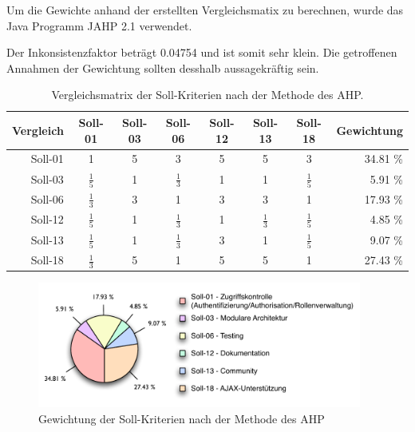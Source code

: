   Um die Gewichte anhand der erstellten Vergleichsmatix zu berechnen, wurde das
  Java Programm JAHP 2.1 verwendet.
  
  Der Inkonsistenzfaktor beträgt 0.04754 und ist somit sehr klein. Die
  getroffenen Annahmen der Gewichtung sollten desshalb aussagekräftig sein.
  \newline
  
  \begin{table}[!h]
    \sffamily 
    \begin{center}
      \begin{tabular}{r|cccccc|r}
        \toprule
        \textbf{Vergleich} & Soll-01 & Soll-03 & Soll-06 & Soll-12 & Soll-13 &
        Soll-18 & \textbf{Gewichtung}\\
        \midrule
        Soll-01 & 1 & 5 & 3 & 5 & 5 & 3 & 34.81 \%\\
        Soll-03 & $\frac{1}{5}$ & 1 & $\frac{1}{3}$ & 1 & 1 & $\frac{1}{5}$ &
        5.91 \%\\
        Soll-06 & $\frac{1}{3}$ & 3 & 1 & 3 & 3 & 1 & 17.93 \%\\
        Soll-12 & $\frac{1}{5}$ & 1 & $\frac{1}{3}$ & 1 & $\frac{1}{3}$ &
        $\frac{1}{5}$ & 4.85 \% \\
        Soll-13 & $\frac{1}{5}$ & 1 & $\frac{1}{3}$ & 3 & 1 & $\frac{1}{5}$ &
        9.07 \%\\ Soll-18 & $\frac{1}{3}$ & 5 & 1 & 5 & 5 & 1 & 27.43 \%\\
        \bottomrule
      \end{tabular}
      \caption{Vergleichsmatrix der Soll-Kriterien nach der Methode des AHP.}
      \label{tab:gewichtungDerSollKriterien}
    \end{center}
  \end{table}
  
  \begin{figure}[ht]
    \begin{center}
      \includegraphics[width=0.95\textwidth]{./image/gewichtungSollKriterien.pdf}
      \caption{Gewichtung der Soll-Kriterien nach der Methode des AHP}
      \label{img:gewichtungSollKriterien}
    \end{center}
  \end{figure}
  
